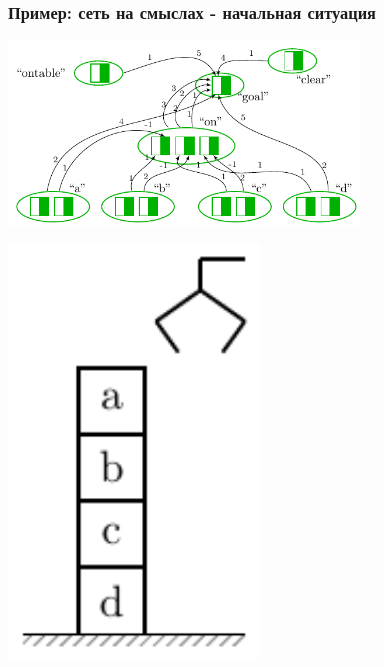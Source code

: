 \documentclass[default]{beamer}
\begin{document}
\begin{frame}
\begin{columns}
\begin{column}{0.3\textwidth}
			\end{column}
		\end{columns}
	\end{frame}	
	
	\begin{frame}
		\frametitle{Пример: сеть на смыслах - начальная ситуация}
		
		\centering
		\includegraphics[page=3,width=0.7\textwidth]{plan/plan_nets}
		\par\bigskip
		\includegraphics[page=2,width=0.5\textwidth]{plan/block_world}
		
		
	\end{frame}	
	
\end{document}
